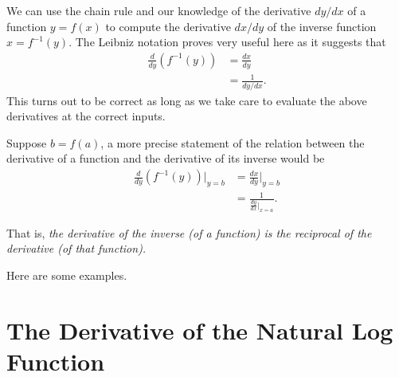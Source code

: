 \documentclass{ximera}
\begin{document}
We can use the chain rule and our knowledge of the derivative $dy/dx$ of a function $y=f(x)$ to compute the derivative $dx/dy$ of the inverse function $x = f^{-1}(y)$. The Leibniz notation proves very useful here as it suggests that
\begin{align*}
\frac{d}{dy} \left(  f^{-1}(y)  \right)  &= \frac{dx}{dy}  \\
                                                      & = \frac{1}{dy/dx} .
\end{align*}
This turns out to be correct as long as we take care to evaluate the above derivatives at the correct inputs.

Suppose $b = f(a)$, a more precise statement of the relation between the derivative of a function and the derivative of its inverse would be
\begin{align*}
\frac{d}{dy} \left(  f^{-1}(y)  \right)\Big|_{y=b}  &= \frac{dx}{dy} \Big|_{y=b} \\
                                                      & = \frac{1}{\frac{dy}{dx} \Big|_{x=a}} .
\end{align*}

That is, \emph{the derivative of the inverse (of a function) is the reciprocal of the derivative (of that function).}

Here are some examples.




\section*{The Derivative of the Natural Log Function}
\end{document}
